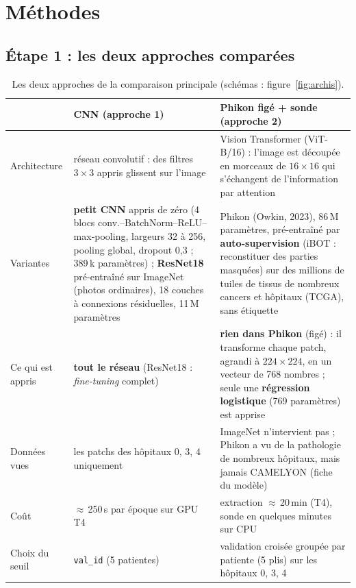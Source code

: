 \documentclass[11pt,a4paper]{article}
\begin{document}
\section{Méthodes}

\subsection{Étape 1 : les deux approches comparées}
\begin{table}[H]
\centering\footnotesize\setlength{\tabcolsep}{4pt}
\begin{tabularx}{\textwidth}{lXX}
\toprule
 & \textbf{CNN (approche 1)} & \textbf{Phikon figé + sonde (approche 2)} \\
\midrule
Architecture & réseau convolutif : des filtres $3\times3$ appris glissent sur l'image & Vision Transformer (ViT-B/16) : l'image est
  découpée en morceaux de $16\times16$ qui s'échangent de l'information par attention \\
Variantes & \textbf{petit CNN} appris de zéro (4 blocs conv.--BatchNorm--ReLU--max-pooling, largeurs 32 à 256, pooling global,
  dropout 0,3 ; 389\,k paramètres) ; \textbf{ResNet18} pré-entraîné sur ImageNet (photos ordinaires), 18 couches à connexions
  résiduelles, 11\,M paramètres & Phikon (Owkin, 2023), 86\,M paramètres, pré-entraîné par \textbf{auto-supervision} (iBOT :
  reconstituer des parties masquées) sur des millions de tuiles de tissus de nombreux cancers et hôpitaux (TCGA), sans étiquette \\
Ce qui est appris & \textbf{tout le réseau} (ResNet18 : \emph{fine-tuning} complet) & \textbf{rien dans Phikon} (figé) : il transforme
  chaque patch, agrandi à $224\times224$, en un vecteur de 768 nombres ; seule une \textbf{régression logistique} (769 paramètres) est apprise \\
Données vues & les patchs des hôpitaux 0, 3, 4 uniquement & ImageNet n'intervient pas ; Phikon a vu de la pathologie de nombreux
  hôpitaux, mais jamais CAMELYON (fiche du modèle) \\
Coût & $\approx$\,250\,s par époque sur GPU T4 & extraction $\approx$\,20\,min (T4), sonde en quelques minutes sur CPU \\
Choix du seuil & \texttt{val\_id} (5 patientes) & validation croisée groupée par patiente (5 plis) sur les hôpitaux 0, 3, 4 \\
\bottomrule
\end{tabularx}
\caption{Les deux approches de la comparaison principale (schémas : figure~\ref{fig:archis}).}
\label{tab:approches}
\end{table}
\end{document}
